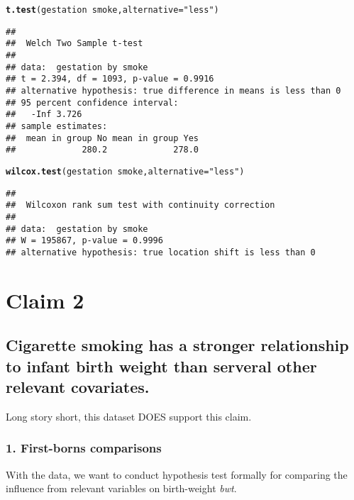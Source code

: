\documentclass{article}\usepackage{graphicx, color}
\makeatletter
\newcommand{\hlfunctioncall}[1]{\textcolor[rgb]{0.501960784313725,0,0.329411764705882}{\textbf{#1}}}%
\newcommand{\hlstring}[1]{\textcolor[rgb]{0.6,0.6,1}{#1}}%
\newenvironment{kframe}{%
 \def\at@end@of@kframe{}%
 \ifinner\ifhmode%
  \def\at@end@of@kframe{\end{minipage}}%
  \begin{minipage}{\columnwidth}%
 \fi\fi%
 \def\FrameCommand##1{\hskip\@totalleftmargin \hskip-\fboxsep
 \colorbox{shadecolor}{##1}\hskip-\fboxsep
     \hskip-\linewidth \hskip-\@totalleftmargin \hskip\columnwidth}%
 \MakeFramed {\advance\hsize-\width
   \@totalleftmargin\z@ \linewidth\hsize
   \@setminipage}}%
 {\par\unskip\endMakeFramed%
 \at@end@of@kframe}
\newenvironment{knitrout}{}{} %
\makeatother
\begin{document}
\begin{knitrout}
\color{fgcolor}\begin{kframe}
\begin{alltt}
\hlfunctioncall{t.test}(gestation ~ smoke, alternative = \hlstring{"less"})
\end{alltt}
\begin{verbatim}
## 
## 	Welch Two Sample t-test
## 
## data:  gestation by smoke 
## t = 2.394, df = 1093, p-value = 0.9916
## alternative hypothesis: true difference in means is less than 0 
## 95 percent confidence interval:
##   -Inf 3.726 
## sample estimates:
##  mean in group No mean in group Yes 
##             280.2             278.0
\end{verbatim}
\begin{alltt}
\hlfunctioncall{wilcox.test}(gestation ~ smoke, alternative = \hlstring{"less"})
\end{alltt}
\begin{verbatim}
## 
## 	Wilcoxon rank sum test with continuity correction
## 
## data:  gestation by smoke 
## W = 195867, p-value = 0.9996
## alternative hypothesis: true location shift is less than 0
\end{verbatim}
\end{kframe}
\end{knitrout}





\newpage
\section*{Claim 2}
\subsection*{Cigarette smoking has a stronger relationship to infant
  birth weight than serveral other relevant covariates.}

\hspace{12 pt} Long story short, this dataset DOES support this claim.

\subsubsection*{1. First-borns comparisons}
\hspace{12 pt} With the data, we want to conduct
hypothesis test formally for comparing the influence from relevant
variables on birth-weight \textit{bwt}. \newline
\end{document}
